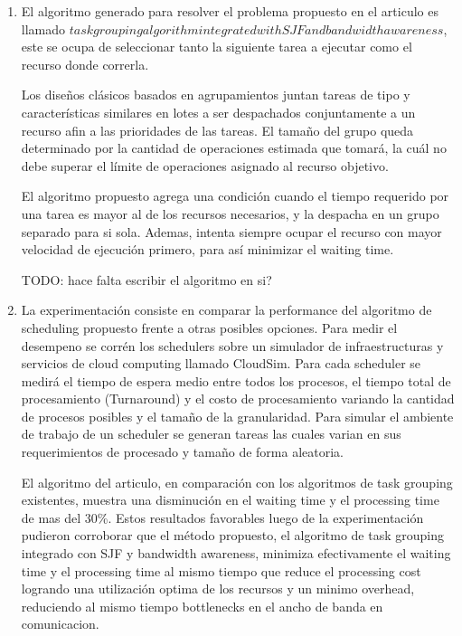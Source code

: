 \begin{enumerate}[label=\alph*)]

    \item El algoritmo generado para resolver el problema propuesto en el articulo es llamado $task grouping
algorithm integrated with SJF and bandwidth awareness$, este se ocupa de seleccionar tanto
        la siguiente tarea a ejecutar como el recurso donde correrla.

        Los diseños clásicos basados en agrupamientos juntan tareas de tipo
        y características similares en lotes a ser despachados conjuntamente
        a un recurso afin a las prioridades de las tareas.
        El tamaño del grupo queda determinado por la cantidad de operaciones
        estimada que tomará, la cuál no debe superar el límite de operaciones
        asignado al recurso objetivo.

        El algoritmo propuesto agrega una condición cuando el tiempo requerido
        por una tarea es mayor al de los recursos necesarios, y la despacha
        en un grupo separado para si sola. Ademas, intenta siempre ocupar
        el recurso con mayor velocidad de ejecución primero, para así minimizar
        el waiting time.

        TODO: hace falta escribir el algoritmo en si?

    \item La experimentación consiste en comparar la performance del algoritmo de scheduling propuesto frente a otras posibles opciones. Para medir el desempeno se corrén los schedulers sobre un simulador de infraestructuras y servicios de cloud computing llamado CloudSim. Para cada scheduler se medirá el tiempo de espera medio entre todos los procesos, el tiempo total de procesamiento (Turnaround) y el costo de procesamiento variando la cantidad de procesos posibles y el tamaño de la granularidad. Para simular el ambiente de trabajo de un scheduler se generan tareas las cuales varian en sus requerimientos de procesado y tamaño de forma aleatoria.

El algoritmo del articulo, en comparación con los algoritmos de task grouping existentes, muestra una disminución en el waiting time y el processing time de mas del 30\%. Estos resultados favorables luego de la experimentación pudieron corroborar que el método propuesto, el algoritmo de task grouping integrado con SJF y bandwidth awareness, minimiza efectivamente el waiting time y el processing time al mismo tiempo que reduce el processing cost logrando una utilización optima de los recursos y un minimo overhead, reduciendo al mismo tiempo bottlenecks en el ancho de banda en comunicacion.

\end{enumerate}

